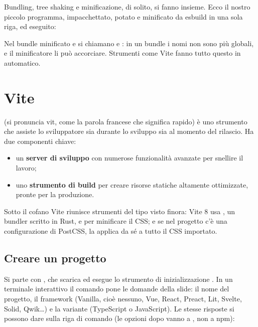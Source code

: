 Bundling, tree shaking e minificazione, di solito, si fanno insieme. Ecco il
nostro piccolo programma, impacchettato, potato e minificato da esbuild in una
sola riga, ed eseguito:


Nel bundle minificato  e  si chiamano  e
: in un bundle i nomi non sono più globali, e il minificatore li può
accorciare. Strumenti come Vite fanno tutto questo in automatico.

\section{Vite}

 (si pronuncia \guillemotleft vit\guillemotright, come la parola
francese che significa \guillemotleft rapido\guillemotright) è uno strumento che
assiste lo sviluppatore sia durante lo sviluppo sia al momento del rilascio. Ha
due componenti chiave:

\begin{itemize}
  \item un \textbf{server di sviluppo} con numerose funzionalità avanzate per
        snellire il lavoro;
  \item uno \textbf{strumento di build} per creare risorse statiche altamente
        ottimizzate, pronte per la produzione.
\end{itemize}

Sotto il cofano Vite riunisce strumenti del tipo visto finora: Vite 8 usa
, un bundler scritto in Rust, e  per
minificare il CSS; e se nel progetto c'è una configurazione di PostCSS, la
applica da sé a tutto il CSS importato.

\subsection{Creare un progetto}

Si parte con , che scarica ed esegue lo strumento
di inizializzazione . In un terminale interattivo il comando
pone le domande della slide: il nome del progetto, il framework (Vanilla, cioè
nessuno, Vue, React, Preact, Lit, Svelte, Solid, Qwik\ldots) e la variante
(TypeScript o JavaScript). Le stesse risposte si possono dare sulla riga di
comando (le opzioni dopo \code{-{}-} vanno a , non a npm):

